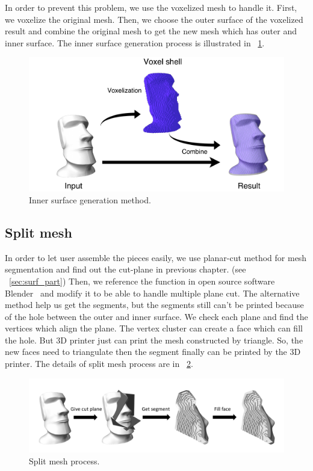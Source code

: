 In order to prevent this problem, we use the voxelized mesh to handle it. 
First, we voxelize the original mesh. 
Then, we choose the outer surface of the voxelized result and combine the original mesh to get the new mesh which has outer and inner surface. 
The inner surface generation process is illustrated in \figname~\ref{fig:inner_surface}.

\begin{figure}[ht]
\centering
\includegraphics[width=1.0\linewidth]{figs/inner2.pdf} 
\caption{Inner surface generation method.}
\label{fig:inner_surface}
\end{figure}

\subsection{Split mesh}
In order to let user assemble the pieces easily, we use planar-cut method for mesh segmentation and find out the cut-plane in previous chapter. (see \secname ~\ref{sec:surf_part}) Then, we reference the function in open source software Blender~\cite{BLD} and modify it to be able to handle multiple plane cut. The alternative method help us get the segments, but the segments still can't be printed because of the hole between the outer and inner surface. We check each plane and find the vertices which align the plane. The vertex cluster can create a face which can fill the hole. But 3{D} printer just can print the mesh constructed by triangle. So, the new faces need to triangulate then the segment finally can be printed by the 3{D} printer. The details of split mesh process are in \figname~\ref{fig:split}.

\begin{figure}[ht]
\centering
\includegraphics[width=1.0\linewidth]{figs/split.pdf} 
\caption{Split mesh process.}
\label{fig:split}
\end{figure}
    
